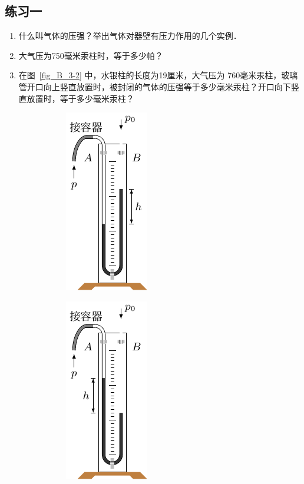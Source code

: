 \subsection*{练习一}
\begin{enumerate}
    \item 什么叫气体的压强？举出气体对器壁有压力作用的几个实例．
    \item 大气压为750毫米汞柱时，等于多少帕？
        \item 在图~\ref{fig_B_3-2} 中，水银柱的长度为19厘米，大气压为
    760毫米汞柱，玻璃管开口向上竖直放置时，被封闭的气体的压强等于多少毫米汞柱？开口向下竖直放置时，等于多少毫米汞柱？
\begin{figure}[htbp]
    \centering
    \begin{subfigure}{0.4\linewidth}
        \centering
        \includegraphics{fig/B/3-3a.pdf}
        \caption{}\label{fig_B_3-3a}
    \end{subfigure}
    \hfil
    \begin{subfigure}{0.4\linewidth}
        \centering
        \includegraphics{fig/B/3-3b.pdf}
        \caption{}\label{fig_B_3-3b}
    \end{subfigure}
    \caption{}\label{fig_B_3-3}
\end{figure}



\end{enumerate}

